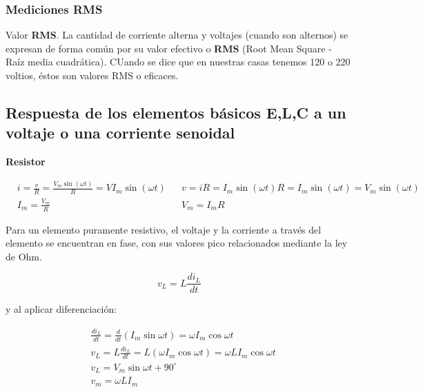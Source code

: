 \subsubsection{Mediciones RMS}

Valor \textbf{RMS}. La cantidad de corriente alterna y voltajes (cuando son alternos) se
expresan de forma común por su valor efectivo o \textbf{RMS} (Root Mean Square - Raíz media cuadrática).
CUando se dice que en nuestras casas tenemos 120 o 220 voltios, éstos son valores RMS o eficaces.

\subsection{Respuesta de los elementos básicos E,L,C a un voltaje o una corriente senoidal}

\textbf{Resistor}


\begin{align*}
	 & i=\frac{v}{R}=\frac{V_{m} \sin(\omega t)}{R}=VI_{m} \sin(\omega t) &  & v=iR= I_{m}\sin(\omega t)R = I_{m} \sin(\omega t)=V_{m} \sin(\omega t) \\
	 & I_{m}=\frac{V_{m}}{R}                                              &  & V_{m}=I_{m}R
\end{align*}

Para un elemento puramente resistivo, el voltaje y la corriente a través del elemento se encuentran en fase, con sus valores pico relacionados mediante la ley de Ohm.

\begin{equation}
	v_{L}=L \frac{di_{L}}{dt}
\end{equation}

y al aplicar diferenciación:

\begin{align*}
	 & \frac{di_{L}}{dt}=\frac{d}{dt}\left(I_{m}\sin{\omega t}\right)=\omega I_{m}\cos{\omega t}     \\
	 & v_{L}=L\frac{di_{L}}{dt}=L\left(\omega I_{m}\cos{\omega t}\right)=\omega LI_{m}\cos{\omega t} \\
	 & v_{L}=V_{m}\sin{\omega t+ 90^{\circ}}                                                         \\
	 & v_{m}=\omega LI_{m}                                                                           \\
\end{align*}

